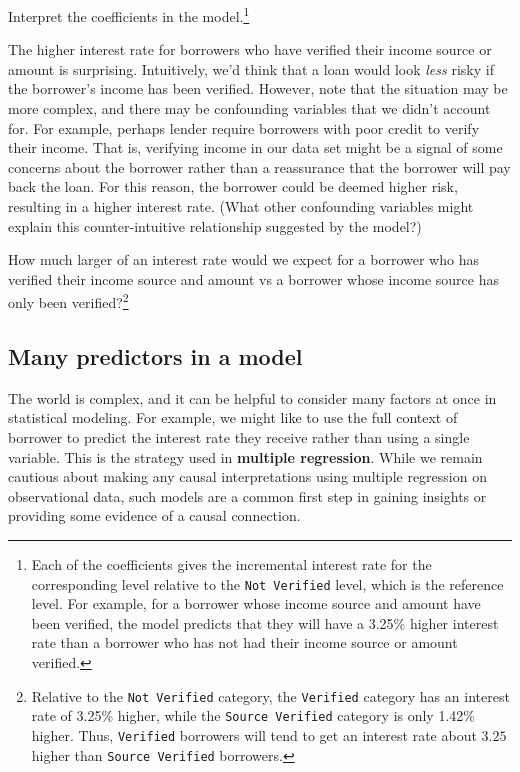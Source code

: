 \documentclass[
  10pt,
  openany]{book}
\theoremstyle{definition}
\theoremstyle{definition}
\theoremstyle{definition}
\theoremstyle{definition}
\theoremstyle{remark}
\begin{document}
Interpret the coefficients in the model.\footnote{Each of the coefficients gives the incremental interest rate for the corresponding level relative to the \texttt{Not\ Verified} level, which is the reference level. For example, for a borrower whose income source and amount have been verified, the model predicts that they will have a 3.25\% higher interest rate than a borrower who has not had their income source or amount verified.}

The higher interest rate for borrowers who have verified their income source or amount is surprising.
Intuitively, we'd think that a loan would look \emph{less} risky if the borrower's income has been verified.
However, note that the situation may be more complex, and there may be confounding variables that we didn't account for.
For example, perhaps lender require borrowers with poor credit to verify their income.
That is, verifying income in our data set might be a signal of some concerns about the borrower rather than a reassurance that the borrower will pay back the loan.
For this reason, the borrower could be deemed higher risk, resulting in a higher interest rate.
(What other confounding variables might explain this counter-intuitive relationship suggested by the model?)

How much larger of an interest rate would we expect for a borrower who has verified their income source and amount vs a borrower whose income source has only been verified?\footnote{Relative to the \texttt{Not\ Verified} category, the \texttt{Verified} category has an interest rate of 3.25\% higher, while the \texttt{Source\ Verified} category is only 1.42\% higher. Thus, \texttt{Verified} borrowers will tend to get an interest rate about \(3.25%
  \) higher than \texttt{Source\ Verified} borrowers.}

\subsection{Many predictors in a model}\label{many-predictors-in-a-model}

The world is complex, and it can be helpful to consider many factors at once in statistical modeling.
For example, we might like to use the full context of borrower to predict the interest rate they receive rather than using a single variable.
This is the strategy used in \textbf{multiple regression}.
While we remain cautious about making any causal interpretations using multiple regression on observational data, such models are a common first step in gaining insights or providing some evidence of a causal connection.
\end{document}
